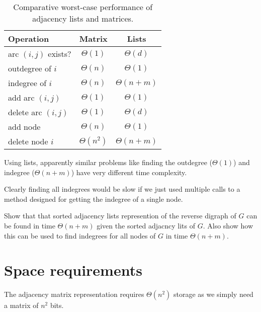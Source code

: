 \begin{table}[H]
\centering
\caption{Comparative worst-case performance of adjacency lists and matrices.}
\label{tbl:basicOpsPerformance}
\begin{tabular}{|l|c|c|}
\hline
\textbf{Operation} 	& \textbf{Matrix} & \textbf{Lists} \\
\hline
arc $(i, j)$ exists? & $\Theta(1)$  & $\Theta(d)$ \\
\hline
outdegree  of $i$ 	& $\Theta(n)$ & $\Theta(1)$ \\
\hline
indegree of $i$ 	& $\Theta(n)$ &  $\Theta(n+m)$ \\
\hline
add arc $(i, j)$ 	& $\Theta(1)$ & $\Theta(1)$  \\
\hline
delete arc $(i, j)$ & $\Theta(1)$  & $\Theta(d)$  \\
\hline
add node 			& $\Theta(n)$ & $\Theta(1)$  \\
\hline
delete node $i$ 	& $\Theta(n^2)$  & $\Theta(n+m)$  \\
\hline
\end{tabular}
\end{table}

Using lists, apparently similar problems like finding the outdegree ($\Theta(1)$) and indegree ($\Theta(n+m)$)
have very different time complexity. 

Clearly finding all indegrees would be slow if we just used multiple calls to a method designed for getting the indegree of a single node. 

\begin{Boxample}[8]
Show that that sorted adjacency lists represention of the reverse digraph of $G$ can be found in time $\Theta(n+m)$ given the sorted adjacncy lits of $G$. Also show how this can be used to find indegrees for all nodes of $G$ in time $\Theta(n+m)$.
\end{Boxample}

\section{Space requirements}
The adjacency matrix representation requires $\Theta(n^2)$ storage 
as we simply need a matrix of $n^2$ bits. 

